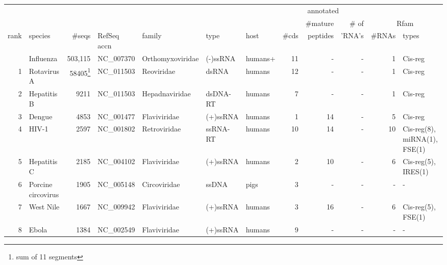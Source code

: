 
\begin{center}
\begin{tabular}{r|l|r|l|l|l|l|r|r|r|r|l}
       &                    &              &                &                &          &        & \multicolumn{3}{c}{annotated} & & \\
       &                    &              &                &                &          &        &       & \#mature & \# of    & \multicolumn{2}{c}{Rfam} \\ 
  rank & species            &       \#seqs & RefSeq accn    & family         & type     & host   & \#cds & peptides & 'RNA's   & \#RNAs & types \\ \hline
       & Influenza          &   503,115    & NC\_007370     & Orthomyxoviridae & (-)ssRNA & humans+&   11 &       - &        - & 1  & Cis-reg \\ 
     1 & Rotavirus A        &58405\footnote{sum of 11 segments}& NC\_011503&Reoviridae&dsRNA&humans&   12 &       - &        - & 1  & Cis-reg  \\ %
     2 & Hepatitis B        &         9211 & NC\_011503      & Hepadnaviridae & dsDNA-RT & humans &     7 &       - &        - & 1  & Cis-reg \\ %
     3 & Dengue             &         4853 & NC\_001477      & Flaviviridae   & (+)ssRNA & humans &     1 &      14 &        - & 5  & Cis-reg  \\ 
     4 & HIV-1              &        2597  & NC\_001802      & Retroviridae   & ssRNA-RT & humans &    10 &      14 &        - & 10 & Cis-reg(8), miRNA(1), FSE(1) \\
     5 & Hepatitis C        &        2185  & NC\_004102      & Flaviviridae   & (+)ssRNA & humans &     2 &      10 &        - & 6  & Cis-reg(5), IRES(1) \\
     6 & Porcine circovirus &        1905  & NC\_005148      & Circoviridae   & ssDNA    & pigs   &     3 &       - &        - & -  & - \\
     7 & West Nile          &        1667  & NC\_009942      & Flaviviridae   & (+)ssRNA & humans &     3 &      16 &        - & 6  & Cis-reg(5), FSE(1) \\
     8 & Ebola              &        1384  & NC\_002549      & Flaviviridae   & (+)ssRNA & humans &     9 &       - &        - & -  & - \\ 

\end{tabular}
\end{center}
